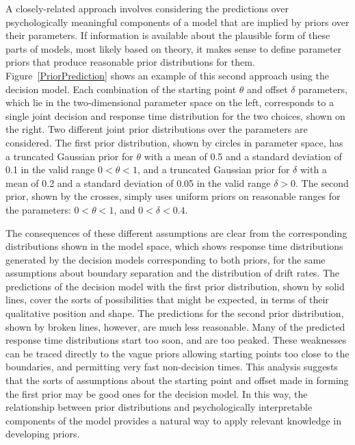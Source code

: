 A closely-related approach involves considering the predictions over psychologically meaningful components of a model that are implied by priors over their parameters. If information is available about the plausible form of these parts of models, most likely based on theory, it makes sense to define parameter priors that produce reasonable prior distributions for them. Figure~\ref{PriorPrediction} shows an example of this second approach using the decision model. Each combination of the starting point $\theta$ and offset $\delta$ parameters, which lie in the two-dimensional parameter space on the left, corresponds to a single joint decision and response time distribution for the two choices, shown on the right. Two different joint prior distributions over the parameters are considered. The first prior distribution, shown by circles in parameter space, has a truncated Gaussian prior for $\theta$ with a mean of 0.5 and a standard deviation of 0.1 in the valid range $0< \theta< 1$, and a truncated Gaussian prior for $\delta$ with a mean of 0.2 and a standard deviation of 0.05 in the valid range $\delta>0$. The second prior, shown by the crosses, simply uses uniform priors on reasonable ranges for the parameters: $0< \theta< 1$, and $0< \delta< 0.4$.

The consequences of these different assumptions are clear from the corresponding distributions shown in the model space, which shows response time distributions generated by the decision models corresponding to both priors, for the same assumptions about boundary separation and the distribution of drift rates. The predictions of the decision model with the first prior distribution, shown by solid lines, cover the sorts of possibilities that might be expected, in terms of their qualitative position and shape. The predictions for the second prior distribution, shown by broken lines, however, are much less reasonable. Many of the predicted response time distributions start too soon, and are too peaked. These weaknesses can be traced directly to the vague priors allowing starting points too close to the boundaries, and permitting very fast non-decision times. This analysis suggests that the sorts of assumptions about the starting point and offset made in forming the first prior may be good ones for the decision model. In this way, the relationship between prior distributions and psychologically interpretable components of the model provides a natural way to apply relevant knowledge in developing priors.

